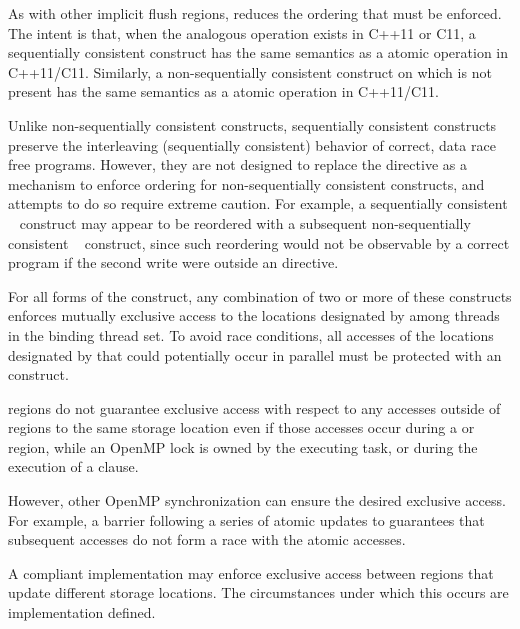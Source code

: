 \begin{note}
As with other implicit flush regions, 
reduces the 
ordering that must be enforced. The intent is that, when the analogous operation exists 
in C++11 or C11, a sequentially consistent  construct has the same semantics as 
a  atomic operation in C++11/C11. Similarly, a 
non-sequentially consistent  construct on which
 is not present has the same semantics as a 
 atomic operation in C++11/C11.

Unlike non-sequentially consistent  constructs, sequentially consistent  
constructs preserve the interleaving (sequentially consistent) behavior of correct, 
data race free programs. However, they are not designed to replace the  directive 
as a mechanism to enforce ordering for non-sequentially consistent  constructs, 
and attempts to do so require extreme caution. For example, a sequentially consistent 
~ construct may appear to be reordered with a subsequent 
non-sequentially consistent ~ construct, since such reordering would not 
be observable by a correct program if the second write were outside an  
directive.
\end{note}

For all forms of the  construct, any combination of two or more
of these  constructs enforces mutually exclusive access to the
locations designated by  among threads in the binding thread set.  To
avoid race conditions, all accesses of the locations designated by 
that could potentially occur in parallel must be protected with an
 construct. 

 regions do not guarantee exclusive access with respect to any accesses outside 
of  regions to the same storage location  even if those accesses occur during a 
 or  region, while an OpenMP lock is owned by the executing 
task, or during the execution of a  clause.

However, other OpenMP synchronization can ensure the desired exclusive access. For 
example, a barrier following a series of atomic updates to  guarantees that subsequent 
accesses do not form a race with the atomic accesses. 

A compliant implementation may enforce exclusive access between  regions 
that update different storage locations. The circumstances under which this occurs are 
implementation defined. 

